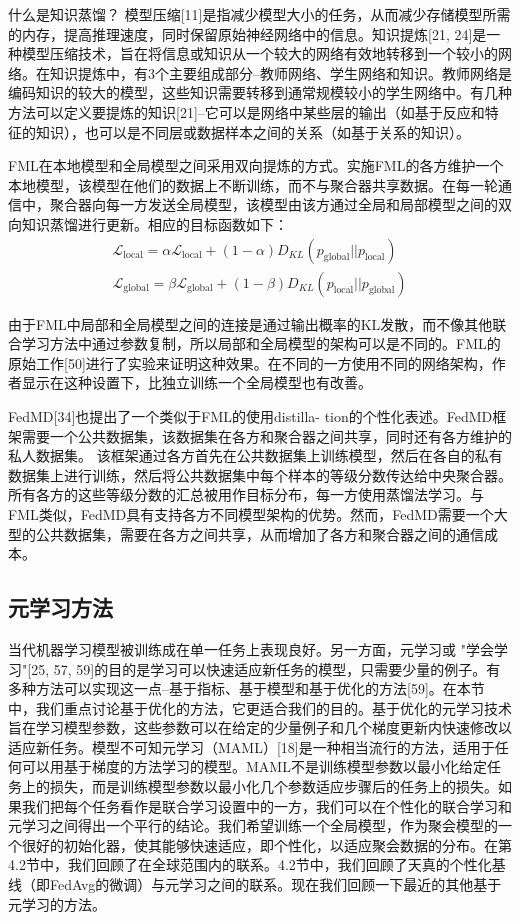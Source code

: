 什么是知识蒸馏？
模型压缩[11]是指减少模型大小的任务，从而减少存储模型所需的内存，提高推理速度，同时保留原始神经网络中的信息。知识提炼[21, 24]是一种模型压缩技术，旨在将信息或知识从一个较大的网络有效地转移到一个较小的网络。在知识提炼中，有3个主要组成部分--教师网络、学生网络和知识。教师网络是编码知识的较大的模型，这些知识需要转移到通常规模较小的学生网络中。有几种方法可以定义要提炼的知识[21]--它可以是网络中某些层的输出（如基于反应和特征的知识），也可以是不同层或数据样本之间的关系（如基于关系的知识）。

FML在本地模型和全局模型之间采用双向提炼的方式。实施FML的各方维护一个本地模型，该模型在他们的数据上不断训练，而不与聚合器共享数据。在每一轮通信中，聚合器向每一方发送全局模型，该模型由该方通过全局和局部模型之间的双向知识蒸馏进行更新。相应的目标函数如下：
\begin{align}
	\mathcal{L}_{\text{local}} = \alpha \mathcal{L}_{\text{local}} + (1 - \alpha)D_{KL}(p_{\text{global}} || p_{\text{local}}) \label{eq:4-9} \\
	\mathcal{L}_{\text{global}} = \beta \mathcal{L}_{\text{global}} + (1 - \beta)D_{KL}(p_{\text{local}} || p_{\text{global}}) \label{eq:4-10}
\end{align}

由于FML中局部和全局模型之间的连接是通过输出概率的KL发散，而不像其他联合学习方法中通过参数复制，所以局部和全局模型的架构可以是不同的。FML的原始工作[50]进行了实验来证明这种效果。在不同的一方使用不同的网络架构，作者显示在这种设置下，比独立训练一个全局模型也有改善。

FedMD[34]也提出了一个类似于FML的使用distilla- tion的个性化表述。FedMD框架需要一个公共数据集，该数据集在各方和聚合器之间共享，同时还有各方维护的私人数据集。 该框架通过各方首先在公共数据集上训练模型，然后在各自的私有数据集上进行训练，然后将公共数据集中每个样本的等级分数传达给中央聚合器。所有各方的这些等级分数的汇总被用作目标分布，每一方使用蒸馏法学习。与FML类似，FedMD具有支持各方不同模型架构的优势。然而，FedMD需要一个大型的公共数据集，需要在各方之间共享，从而增加了各方和聚合器之间的通信成本。

\subsection{元学习方法}
当代机器学习模型被训练成在单一任务上表现良好。另一方面，元学习或 "学会学习"[25, 57, 59]的目的是学习可以快速适应新任务的模型，只需要少量的例子。有多种方法可以实现这一点--基于指标、基于模型和基于优化的方法[59]。在本节中，我们重点讨论基于优化的方法，它更适合我们的目的。基于优化的元学习技术旨在学习模型参数，这些参数可以在给定的少量例子和几个梯度更新内快速修改以适应新任务。模型不可知元学习（MAML）[18]是一种相当流行的方法，适用于任何可以用基于梯度的方法学习的模型。MAML不是训练模型参数以最小化给定任务上的损失，而是训练模型参数以最小化几个参数适应步骤后的任务上的损失。如果我们把每个任务看作是联合学习设置中的一方，我们可以在个性化的联合学习和元学习之间得出一个平行的结论。我们希望训练一个全局模型，作为聚会模型的一个很好的初始化器，使其能够快速适应，即个性化，以适应聚会数据的分布。在第4.2节中，我们回顾了在全球范围内的联系。4.2节中，我们回顾了天真的个性化基线（即FedAvg的微调）与元学习之间的联系。现在我们回顾一下最近的其他基于元学习的方法。

